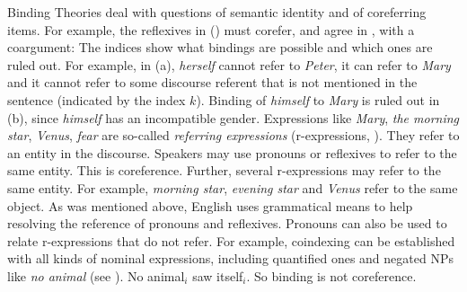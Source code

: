 \documentclass[output=paper,biblatex,babelshorthands,newtxmath,draftmode,colorlinks,citecolor=brown]{langscibook}
\begin{document}
Binding Theories deal with questions of semantic identity and  of coreferring
items. For example, the reflexives in () must corefer, and agree in , with a
coargument:
\eal
\label{ex-binding-reflexives}
\zl
The indices show what bindings are possible and which ones are ruled out. For example, in
(a), \emph{herself} cannot refer to \emph{Peter}, it can refer to \emph{Mary} and it cannot
refer to some discourse referent that is not mentioned in the sentence (indicated by the index
$k$). Binding of \emph{himself} to \emph{Mary} is ruled out in (b), since \emph{himself}
has an incompatible gender. Expressions like \emph{Mary}, \emph{the morning star}, \emph{Venus}, \emph{fear} are
so-called \emph{referring expressions} (r-expressions, \citealt[]{Chomsky81a}). They refer to an entity in the discourse. Speakers
may use pronouns or reflexives to refer to the same entity. This is coreference.
Further, several r-expressions may refer to the same entity. For example, \emph{morning star}, \emph{evening
  star} and \emph{Venus} refer to the same object. As was mentioned above, English uses
grammatical means to help resolving the reference of pronouns and reflexives. Pronouns can also be
used to relate r-expressions that do not refer. For example, coindexing can be established with all kinds of nominal expressions, including
quantified ones and negated NPs like \emph{no animal} (see \citealp[--129]{BP80a}).
\ea
No animal$_i$ saw itself$_i$.
\z
So binding is not coreference.
\end{document}
